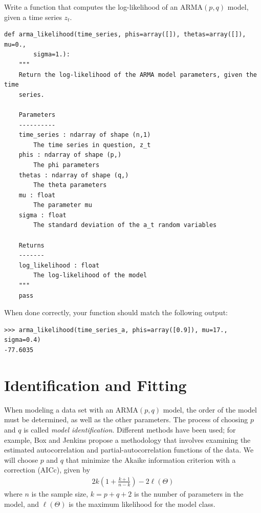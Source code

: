 \begin{problem}
\label{prob:arma:likelihood}
Write a function that computes the log-likelihood of an $\text{ARMA}(p,q)$
model, given a time series $z_t$.

\begin{lstlisting}
def arma_likelihood(time_series, phis=array([]), thetas=array([]), mu=0.,
        sigma=1.):
    """
    Return the log-likelihood of the ARMA model parameters, given the time
    series.

    Parameters
    ----------
    time_series : ndarray of shape (n,1)
        The time series in question, z_t
    phis : ndarray of shape (p,)
        The phi parameters
    thetas : ndarray of shape (q,)
        The theta parameters
    mu : float
        The parameter mu
    sigma : float
        The standard deviation of the a_t random variables

    Returns
    -------
    log_likelihood : float
        The log-likelihood of the model
    """
    pass
\end{lstlisting}

\vspace{3mm} \noindent
When done correctly, your function should match the following output:
\begin{lstlisting}
>>> arma_likelihood(time_series_a, phis=array([0.9]), mu=17., sigma=0.4)
-77.6035
\end{lstlisting}
\end{problem}

\section*{Identification and Fitting}

When modeling a data set with an $\text{ARMA}(p,q)$ model, the order of the
model must be determined, as well as the other parameters. The process of
choosing $p$ and $q$ is called \emph{model identification}. Different methods have
been used; for example, Box and Jenkins propose a methodology that involves
examining the estimated autocorrelation and partial-autocorrelation functions
of the data. We will choose $p$ and $q$ that minimize the Akaike information
criterion with a correction (AICc), given by
\begin{align}
    2k\left(1 + \frac{k+1}{n-k}\right) - 2 \ell(\Theta)
\end{align}
where $n$ is the sample size, $k = p + q + 2$ is the number of parameters in
the model, and $\ell(\Theta)$ is the maximum likelihood for the model class.

